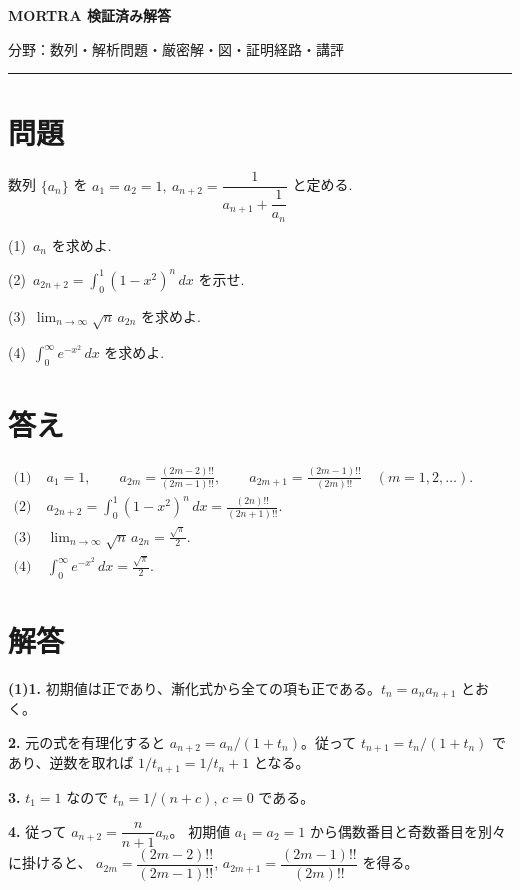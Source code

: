 \documentclass[uplatex,dvipdfmx,11pt]{jsarticle}
\begin{document}
\begin{center}
{\LARGE\bfseries MORTRA 検証済み解答\par}
\vspace{1mm}
{\small 分野：数列・解析\qquad 問題・厳密解・図・証明経路・講評}
\end{center}
\vspace{1mm}
\hrule
\vspace{5mm}

\section*{問題}
数列 $\{a_n\}$ を $a_1=a_2=1,\ a_{n+2}=\dfrac{1}{a_{n+1}+\dfrac{1}{a_n}}$ と定める.

(1)\ $a_n$ を求めよ.

(2)\ $a_{2n+2}=\displaystyle\int_0^1 (1-x^2)^n\,dx$ を示せ.

(3)\ $\displaystyle\lim_{n\to\infty}\sqrt{n}\,a_{2n}$ を求めよ.

(4)\ $\displaystyle\int_0^\infty e^{-x^2}\,dx$ を求めよ.

\section*{答え}
\(\begin{aligned}\text{(1)}\;&a_1=1,\qquad a_{2m}=\frac{(2m-2)!!}{(2m-1)!!},\qquad a_{2m+1}=\frac{(2m-1)!!}{(2m)!!}\quad(m=1,2,\ldots).\\\text{(2)}\;&a_{2n+2}=\int_0^1(1-x^2)^{n}\,dx=\frac{(2n)!!}{(2n+1)!!}.\\\text{(3)}\;&\lim_{n\to\infty}\sqrt{n}\,a_{2n}=\frac{\sqrt\pi}2.\\\text{(4)}\;&\int_0^\infty e^{-x^2}\,dx=\frac{\sqrt\pi}2.\end{aligned}\)

\section*{解答}
\textbf{(1)}\quad \textbf{1.} 初期値は正であり、漸化式から全ての項も正である。\(t_n=a_na_{n+1}\) とおく。

\textbf{2.} 元の式を有理化すると \(a_{n+2}=a_n/(1+t_n)\)。従って \(t_{n+1}=t_n/(1+t_n)\) であり、逆数を取れば \(1/t_{n+1}=1/t_n+1\) となる。

\textbf{3.} \(t_1=1\) なので \(t_n=1/(n+c)\), \(c=0\) である。

\textbf{4.} 従って \(a_{n+2}=\dfrac{n}{n+1}a_n\)。 初期値 \(a_1=a_2=1\) から偶数番目と奇数番目を別々に掛けると、 \(a_{2m}=\dfrac{(2m-2)!!}{(2m-1)!!}\),  \(a_{2m+1}=\dfrac{(2m-1)!!}{(2m)!!}\) を得る。
\end{document}
